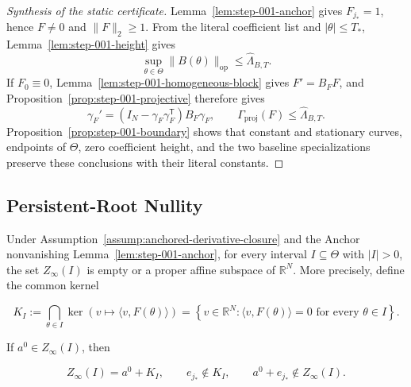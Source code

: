 \begin{proof}[Synthesis of the static certificate]
Lemma~\ref{lem:step-001-anchor} gives
$F_{j_*}=1$, hence $F\neq0$ and $\|F\|_2\geq1$.  From the literal
coefficient list and $|\theta|\leq T_*$, Lemma~\ref{lem:step-001-height}
gives
\begin{equation}
\label{eq:appendix-display-031}
\sup_{\theta\in\Theta}\|B(\theta)\|_{\mathrm{op}}
\leq\widehat\Lambda_{B,T}.
\end{equation}
If $F_0\equiv0$, Lemma~\ref{lem:step-001-homogeneous-block} gives
$F'=B_FF$, and Proposition~\ref{prop:step-001-projective} therefore gives
\begin{equation}
\label{eq:appendix-display-032}
\gamma_F'
=(I_N-\gamma_F\gamma_F^{\mathsf T})B_F\gamma_F,
\qquad
\Gamma_{\mathrm{proj}}(F)\leq\widehat\Lambda_{B,T}.
\end{equation}
Proposition~\ref{prop:step-001-boundary} shows that constant and stationary
curves, endpoints of $\Theta$, zero coefficient height, and the two baseline
specializations preserve these conclusions with their literal constants.
\end{proof}

\subsection{Persistent-Root Nullity}\label{app:step-002}

\begin{lemma}
\label{lem:step-002-affine-locus}

Under Assumption~\ref{assump:anchored-derivative-closure} and the Anchor nonvanishing
Lemma~\ref{lem:step-001-anchor}, for every interval \(I\subseteq\Theta\) with \(\lvert I\rvert>0\), the set
\(Z_\infty(I)\) is empty or a proper affine subspace of \(\mathbb R^N\). More precisely, define the common
kernel

\begin{equation}
\label{eq:appendix-display-033}
K_I
:=\bigcap_{\theta\in I}
\ker\!\left(v\longmapsto\langle v,F(\theta)\rangle\right)
=\left\{v\in\mathbb R^N:
\langle v,F(\theta)\rangle=0
\text{ for every }\theta\in I\right\}.
\end{equation}

If \(a^0\in Z_\infty(I)\), then

\begin{equation}
\label{eq:appendix-display-034}
Z_\infty(I)=a^0+K_I,
\qquad
e_{j_*}\notin K_I,
\qquad
a^0+e_{j_*}\notin Z_\infty(I).
\end{equation}


\end{lemma}

